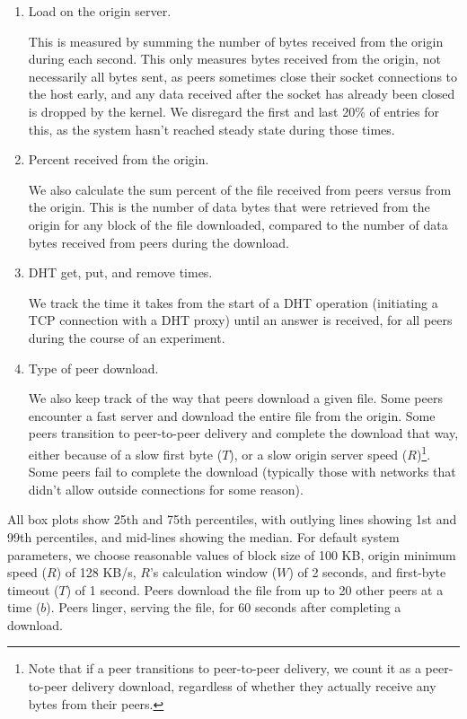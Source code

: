 \begin{enumerate}
\item
Load on the origin server.

This is measured by summing the number of 
bytes received from the origin during each second.  This only measures bytes received from the origin, not necessarily all bytes sent, 
as peers sometimes close their socket connections to the host early, and any data received after the socket has already been closed is dropped by the kernel.  
We disregard the first and last 20\% of entries for this, as the system hasn't reached steady state during those times.
\item
Percent received from the origin.

We also calculate the sum percent of the file received from peers versus from the origin.  This is the number of data bytes that were retrieved
from the origin for any block of the file downloaded, compared to the number of data bytes received from peers during the download.

\item
DHT get, put, and remove times.

We track the time it takes from the start of a DHT operation (initiating a TCP connection with a DHT proxy) 
until an answer is received, for all peers during the course of an experiment.

\item
Type of peer download.

We also keep track of the way that peers download a given file.  Some peers encounter a fast server and download the entire file from the origin.
Some peers transition to peer-to-peer delivery and complete the download that way, either because of a slow first byte ($T$), 
or a slow origin server speed ($R$)\footnote{Note that if a peer transitions to peer-to-peer delivery, we count it as
a peer-to-peer delivery download, regardless of whether they actually receive any bytes from their peers.}.  Some peers 
fail to complete the download (typically those with networks that didn't allow outside connections for some reason).

\end{enumerate}

All box plots show 25th and 75th percentiles, with outlying lines showing 1st and 99th percentiles, and mid-lines showing the median.
For default system parameters, we choose reasonable values of block size of 100 KB, origin minimum speed ($R$) of 128 KB/s, $R$'s calculation window ($W$) 
of 2 seconds, and first-byte timeout ($T$) of 1 second.  Peers download the file from up to 20 other peers at a time ($b$).
Peers linger, serving the file, for 60 seconds after completing a download.

